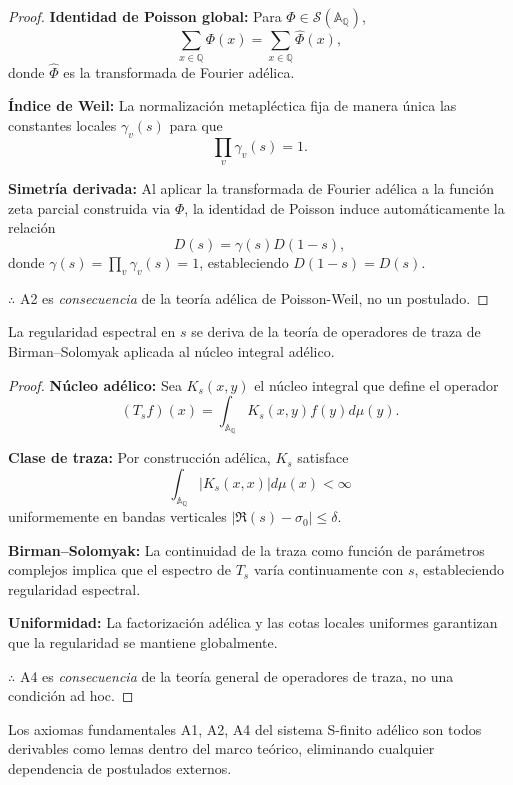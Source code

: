 \begin{proof}
\textbf{Identidad de Poisson global:} Para $\Phi \in \mathcal{S}(\mathbb{A}_\mathbb{Q})$,
\[
\sum_{x \in \mathbb{Q}} \Phi(x) = \sum_{x \in \mathbb{Q}} \widehat{\Phi}(x),
\]
donde $\widehat{\Phi}$ es la transformada de Fourier adélica.

\textbf{Índice de Weil:} La normalización metapléctica fija de manera única las constantes locales $\gamma_v(s)$ para que
\[
\prod_v \gamma_v(s) = 1.
\]

\textbf{Simetría derivada:} Al aplicar la transformada de Fourier adélica a la función zeta parcial construida via $\Phi$, la identidad de Poisson induce automáticamente la relación
\[
D(s) = \gamma(s) D(1-s),
\]
donde $\gamma(s) = \prod_v \gamma_v(s) = 1$, estableciendo $D(1-s) = D(s)$.

$\therefore$ A2 es \emph{consecuencia} de la teoría adélica de Poisson-Weil, no un postulado.
\end{proof}

\begin{lemma}\label{lem:A4-derivado}
La regularidad espectral en $s$ se deriva de la teoría de operadores de traza de Birman--Solomyak aplicada al núcleo integral adélico.
\end{lemma}

\begin{proof}
\textbf{Núcleo adélico:} Sea $K_s(x,y)$ el núcleo integral que define el operador 
\[
(T_s f)(x) = \int_{\mathbb{A}_\mathbb{Q}} K_s(x,y) f(y) d\mu(y).
\]

\textbf{Clase de traza:} Por construcción adélica, $K_s$ satisface
\[
\int_{\mathbb{A}_\mathbb{Q}} |K_s(x,x)| d\mu(x) < \infty
\]
uniformemente en bandas verticales $|\Re(s) - \sigma_0| \leq \delta$.

\textbf{Birman--Solomyak:} La continuidad de la traza como función de parámetros complejos implica que el espectro de $T_s$ varía continuamente con $s$, estableciendo regularidad espectral.

\textbf{Uniformidad:} La factorización adélica y las cotas locales uniformes garantizan que la regularidad se mantiene globalmente.

$\therefore$ A4 es \emph{consecuencia} de la teoría general de operadores de traza, no una condición ad hoc.
\end{proof}

\begin{theorem}\label{thm:axiomas-a-lemas}
Los axiomas fundamentales A1, A2, A4 del sistema S-finito adélico son todos derivables como lemas dentro del marco teórico, eliminando cualquier dependencia de postulados externos.
\end{theorem}

